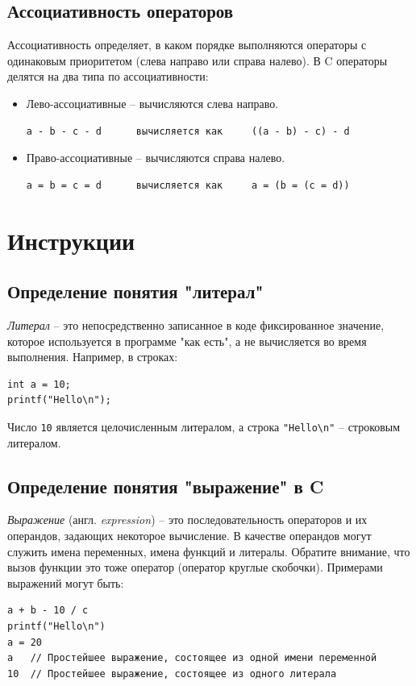 \documentclass[10pt]{article}
\begin{document}
\subsection*{Ассоциативность операторов}
Ассоциативность определяет, в каком порядке выполняются операторы с одинаковым приоритетом (слева направо или справа налево).
В C операторы делятся на два типа по ассоциативности:
\begin{itemize}
\item Лево-ассоциативные -- вычисляются слева направо.
\begin{lstlisting}
a - b - c - d      вычисляется как     ((a - b) - c) - d 
\end{lstlisting}
\item Право-ассоциативные -- вычисляются справа налево.
\begin{lstlisting}
a = b = c = d      вычисляется как     a = (b = (c = d))
\end{lstlisting}
\end{itemize}


\newpage

\section*{Инструкции}
\subsection*{Определение понятия "литерал"{}}
\textit{Литерал} -- это непосредственно записанное в коде фиксированное значение, которое используется в программе "как есть"{}, а не вычисляется во время выполнения. Например, в строках:
\begin{lstlisting}
int a = 10;
printf("Hello\n");
\end{lstlisting}
Число \texttt{10} является целочисленным литералом, а строка \texttt{"Hello\textbackslash n"} -- строковым литералом.

\subsection*{Определение понятия "выражение"{} в C}
\textit{Выражение} (англ. \textit{expression}) -- это последовательность операторов и их операндов, задающих некоторое вычисление. В качестве операндов могут служить имена переменных, имена функций и литералы. Обратите внимание, что вызов функции это тоже оператор (оператор круглые скобочки). Примерами выражений могут быть:
\begin{lstlisting}
a + b - 10 / c
printf("Hello\n")
a = 20
a  	// Простейшее выражение, состоящее из одной имени переменной
10  // Простейшее выражение, состоящее из одного литерала
\end{lstlisting}
\end{document}
